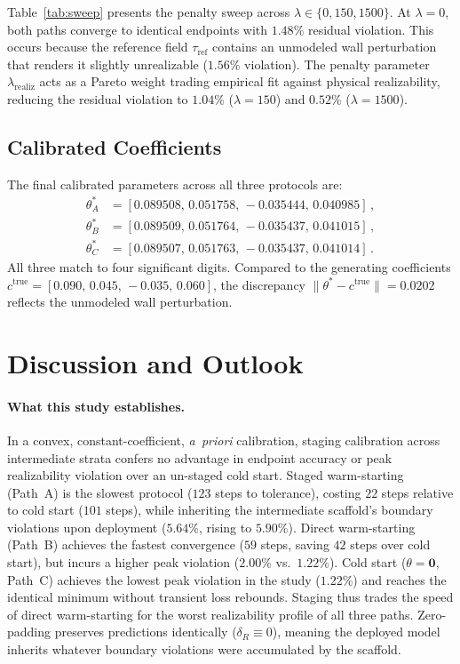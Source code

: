 \documentclass[preprint,aps,prb,longbibliography,superscriptaddress]{revtex4-2}
\newcommand{\tref}{\tau_{\text{ref}}}
\begin{document}
Table~\ref{tab:sweep} presents the penalty sweep across $\lambda \in \{0, 150, 1500\}$.
At $\lambda = 0$, both paths converge to identical endpoints with $1.48\%$
residual violation. This occurs because the reference field $\tref$ contains an
unmodeled wall perturbation that renders it slightly unrealizable ($1.56\%$
violation). The penalty parameter $\lambda_{\mathrm{realiz}}$ acts as a Pareto
weight trading empirical fit against physical realizability, reducing the
residual violation to $1.04\%$ ($\lambda=150$) and $0.52\%$ ($\lambda=1500$).

\subsection{Calibrated Coefficients}\label{sec:coefficients}

The final calibrated parameters across all three protocols are:
\begin{align}
  \theta_A^* &= [0.089508,\, 0.051758,\, {-}0.035444,\, 0.040985]\,, \\
  \theta_B^* &= [0.089509,\, 0.051764,\, {-}0.035437,\, 0.041015]\,, \\
  \theta_C^* &= [0.089507,\, 0.051763,\, {-}0.035437,\, 0.041014]\,.
\end{align}
All three match to four significant digits. Compared to the generating
coefficients $c^{\mathrm{true}} = [0.090,\, 0.045,\, {-}0.035,\, 0.060]$, the
discrepancy $\|\theta^* - c^{\mathrm{true}}\| = 0.0202$ reflects the unmodeled
wall perturbation.

\section{Discussion and Outlook}\label{sec:discussion}

\paragraph{What this study establishes.}
In a convex, constant-coefficient, \emph{a~priori} calibration, staging calibration across intermediate strata confers no advantage in endpoint accuracy or peak realizability violation over an un-staged cold start. Staged warm-starting (Path~A) is the slowest protocol ($123$ steps to tolerance), costing $22$ steps relative to cold start ($101$ steps), while inheriting the intermediate scaffold's boundary violations upon deployment ($5.64\%$, rising to $5.90\%$). Direct warm-starting (Path~B) achieves the fastest convergence ($59$ steps, saving $42$ steps over cold start), but incurs a higher peak violation ($2.00\%$ vs.\ $1.22\%$). Cold start ($\theta = \mathbf{0}$, Path~C) achieves the lowest peak violation in the study ($1.22\%$) and reaches the identical minimum without transient loss rebounds. Staging thus trades the speed of direct warm-starting for the worst realizability profile of all three paths. Zero-padding preserves predictions identically ($\delta_R \equiv 0$), meaning the deployed model inherits whatever boundary violations were accumulated by the scaffold.
\end{document}
